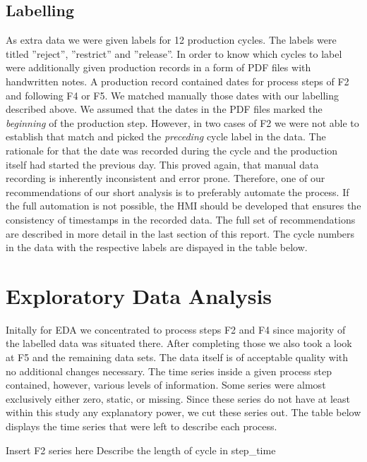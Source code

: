 \documentclass{article}
\begin{document}
\subsection{Labelling}
As extra data we were given labels for 12 production cycles. The labels were titled ''reject'', ''restrict'' and ''release''. In order to know which cycles to label were additionally given production records in a form of PDF files with handwritten notes. A production record contained dates for process steps of F2 and following F4 or F5. We matched manually those dates with our labelling described above. We assumed that the dates in the PDF files marked the \emph{beginning} of the production step. However, in two cases of F2 we were not able to establish that match and picked the \emph{preceding} cycle label in the data. The rationale for that the date was recorded during the cycle and the production itself had started the previous day. This proved again, that manual data recording is inherently inconsistent and error prone. Therefore, one of our recommendations of our short analysis is to preferably automate the process. If the full automation is not possible, the HMI should be developed that ensures the consistency of timestamps in the recorded data. The full set of recommendations are described in more detail in the last section of this report. The cycle numbers in the data with the respective labels are dispayed in the table below.

\begin{tabular}
\end{tabular}

\section{Exploratory Data Analysis}
Initally for EDA we concentrated to process steps F2 and F4 since majority of the labelled data was situated there. After completing those we also took a look at F5 and the remaining data sets. The data itself is of acceptable quality with no additional changes necessary. The time series inside a given process step contained, however, various levels of information. Some series were almost exclusively either zero, static, or missing. Since these series do not have at least within this study any explanatory power, we cut these series out. The table below displays the time series that were left to describe each process.

Insert F2 series here
Describe the length of cycle in step_time
\end{document}
